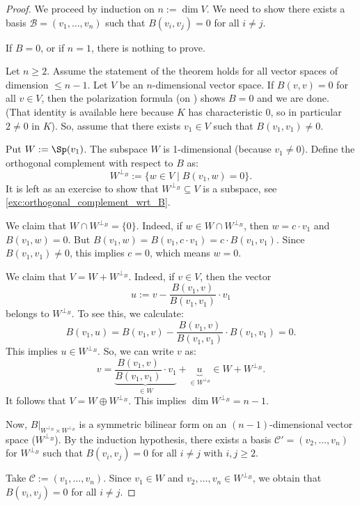 \begin{proof}
We proceed by induction on $n := \dim V$. We need to show there exists a basis $\mathcal{B} = (v_1, \dots, v_n)$ such that $B(v_i, v_j) = 0$ for all $i \neq j$.

If $B = 0$, or if $n = 1$, there is nothing to prove.

Let $n \ge 2$. Assume the statement of the theorem holds for all vector spaces of dimension $\le n-1$. Let $V$ be an $n$-dimensional vector space.
If $B(v, v) = 0$ for all $v \in V$, then the polarization formula (on ) shows $B = 0$ and we are done. (That identity is available here because $K$ has characteristic $0$, so in particular $2 \neq 0$ in $K$). So, assume that there exists $v_1 \in V$ such that $B(v_1, v_1) \neq 0$.

Put $W := \Sp(v_1)$. The subspace $W$ is 1-dimensional (because $v_1 \neq 0$). Define the orthogonal complement with respect to $B$ as:
\[
W^{\perp_B} := \{ w \in V \mid B(v_1, w) = 0 \}.
\]
It is left as an exercise to show that $W^{\perp_B} \subseteq V$ is a subspace, see \cref{exc:orthogonal_complement_wrt_B}.

We claim that $W \cap W^{\perp_B} = \{0\}$. Indeed, if $w \in W \cap W^{\perp_B}$, then $w = c \cdot v_1$ and $B(v_1, w) = 0$. But $B(v_1, w) = B(v_1, c \cdot v_1) = c \cdot B(v_1, v_1)$. Since $B(v_1, v_1) \neq 0$, this implies $c = 0$, which means $w = 0$.

We claim that $V = W + W^{\perp_B}$.
Indeed, if $v \in V$, then the vector 
\[
u := v - \frac{B(v_1, v)}{B(v_1, v_1)} \cdot v_1
\]
belongs to $W^{\perp_B}$. To see this, we calculate:
\[
B(v_1, u) = B(v_1, v) - \frac{B(v_1, v)}{B(v_1, v_1)} \cdot B(v_1, v_1) = 0.
\]
This implies $u \in W^{\perp_B}$. So, we can write $v$ as:
\[
v = \underbrace{\frac{B(v_1, v)}{B(v_1, v_1)} \cdot v_1}_{\in W} + \underbrace{u}_{\in W^{\perp_B}} \in W + W^{\perp_B}.
\]
It follows that $V = W \oplus W^{\perp_B}$. This implies $\dim W^{\perp_B} = n - 1$.

Now, $B|_{W^{\perp_B} \times W^{\perp_B}}$ is a symmetric bilinear form on an $(n-1)$-dimensional vector space ($W^{\perp_B}$). By the induction hypothesis, there exists a basis $\mathcal{C}' = (v_2, \dots, v_n)$ for $W^{\perp_B}$ such that $B(v_i, v_j) = 0$ for all $i \neq j$ with $i, j \ge 2$.

Take $\mathcal{C} := (v_1, \dots, v_n)$. Since $v_1 \in W$ and $v_2, \dots, v_n \in W^{\perp_B}$, we obtain that $B(v_i, v_j) = 0$ for all $i \neq j$.
\end{proof}

